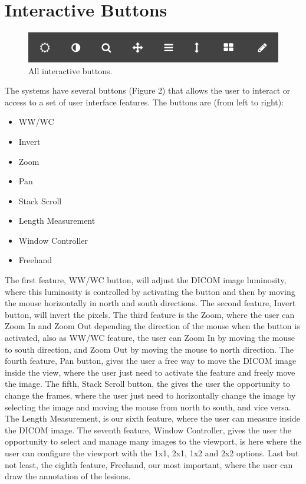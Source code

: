\documentclass{article}
\begin{document}
\section{Interactive Buttons}

\begin{figure}[h]
\caption{All interactive buttons.}
\centering
\includegraphics[width=\textwidth]{img4.png}
\end{figure}

The systems have several buttons (Figure 2) that allows the user to interact or access to a set of user interface features. The buttons are (from left to right):

\begin{itemize}
  \item WW/WC
  \item Invert
  \item Zoom
  \item Pan
  \item Stack Scroll
  \item Length Measurement
  \item Window Controller
  \item Freehand
\end{itemize}

The first feature, WW/WC button, will adjust the DICOM image luminosity, where this luminosity is controlled by activating the button and then by moving the mouse horizontally in north and south directions. The second feature, Invert button, will invert the pixels. The third feature is the Zoom, where the user can Zoom In and Zoom Out depending the direction of the mouse when the button is activated, also as WW/WC feature, the user can Zoom In by moving the mouse to south direction, and Zoom Out by moving the mouse to north direction. The fourth feature, Pan button, gives the user a free way to move the DICOM image inside the view, where the user just need to activate the feature and freely move the image. The fifth, Stack Scroll button, the gives the user the opportunity to change the frames, where the user just need to horizontally change the image by selecting the image and moving the mouse from north to south, and vice versa. The Length Measurement, is our sixth feature, where the user can measure inside the DICOM image. The seventh feature, Window Controller, gives the user the opportunity to select and manage many images to the viewport, is here where the user can configure the viewport with the 1x1, 2x1, 1x2 and 2x2 options. Last but not least, the eighth feature, Freehand, our most important, where the user can draw the annotation of the lesions.
\end{document}
